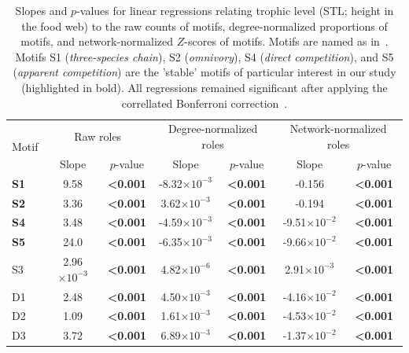 \documentclass[12pt]{article}
\begin{document}
    \begin{table}[h!]
        \caption{Slopes and $p$-values for linear regressions relating trophic level (STL; height in the food web) to the raw counts of motifs, degree-normalized proportions of motifs, and network-normalized $Z$-scores of motifs. Motifs are named as in~\citet{Stouffer2007}. Motifs S1 (\emph{three-species chain}), S2 (\emph{omnivory}), S4 (\emph{direct competition}), and S5 (\emph{apparent competition}) are the 'stable' motifs of particular interest in our study (highlighted in bold). All regressions remained significant after applying the correllated Bonferroni correction~\citep{Drezner2016}.}
        \label{TL_lms}
        \begin{tabular}{l | c c c c c c }
        \multirow{2}{*}{Motif} & \multicolumn{2}{c}{Raw roles} & \multicolumn{2}{c}{Degree-normalized roles} & \multicolumn{2}{c}{Network-normalized roles} \\
        & Slope & $p$-value & Slope & $p$-value & Slope & $p$-value \\
        \hline
        \textbf{S1}	&	9.58	&	\textbf{\textless0.001}	&	-8.32$\times10^{-3}$	&	\textbf{\textless0.001}	&	-0.156	&	\textbf{\textless0.001}	\\
        \textbf{S2}	&	3.36	&	\textbf{\textless0.001}	&	3.62$\times10^{-3}$	&	\textbf{\textless0.001}	&	-0.194	&	\textbf{\textless0.001}	\\
        \textbf{S4}	&	3.48	&	\textbf{\textless0.001}	&	-4.59$\times10^{-3}$	&	\textbf{\textless0.001}	&	-9.51$\times10^{-2}$	&	\textbf{\textless0.001}	\\
        \textbf{S5}	&	24.0	&	\textbf{\textless0.001}	&	-6.35$\times10^{-3}$	&	\textbf{\textless0.001}	&	-9.66$\times10^{-2}$	&	\textbf{\textless0.001}	\\
        \hline													
        S3	&	2.96$\times10^{-3}$	&	\textbf{\textless0.001}	&	4.82$\times10^{-6}$	&	\textbf{\textless0.001}	&	2.91$\times10^{-3}$	&	\textbf{\textless0.001}	\\
        D1	&	2.48	&	\textbf{\textless0.001}	&	4.50$\times10^{-3}$	&	\textbf{\textless0.001}	&	-4.16$\times10^{-2}$	&	\textbf{\textless0.001}	\\
        D2	&	1.09	&	\textbf{\textless0.001}	&	1.61$\times10^{-3}$	&	\textbf{\textless0.001}	&	-4.53$\times10^{-2}$	&	\textbf{\textless0.001}	\\
        D3	&	3.72	&	\textbf{\textless0.001}	&	6.89$\times10^{-3}$	&	\textbf{\textless0.001}	&	-1.37$\times10^{-2}$	&	\textbf{\textless0.001}	\\

\end{tabular}
\end{table}
\end{document}
